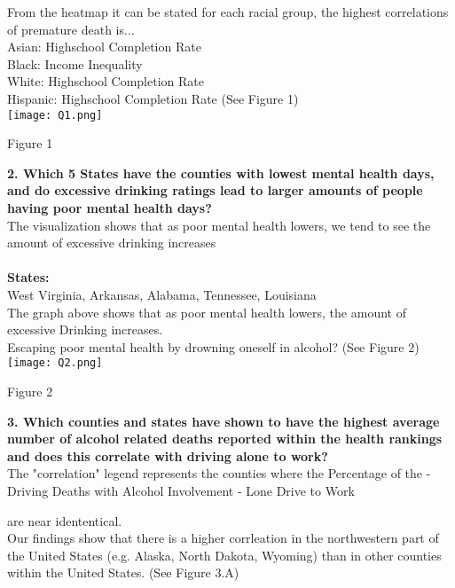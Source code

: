 \documentclass[conference]{IEEEtran}
\begin{document}
From the heatmap it can be stated for each
racial group, the highest correlations of premature death is...\\
Asian: Highschool Completion Rate\\
Black: Income Inequality\\
White: Highschool Completion Rate\\
Hispanic: Highschool Completion Rate (See Figure 1)\\

\texttt{[image: Q1.png]}
\begin{center}
\footnotesize{Figure 1}    
\end{center}

\textbf{2. Which 5 States have the counties with lowest mental
health days, and do
excessive drinking ratings lead to larger amounts of people
having poor mental
health days?}\\

The visualization shows that as poor
mental health lowers, we tend to see
the amount of excessive drinking increases\\
\\
\textbf{States:}\\
West Virginia,
Arkansas,
Alabama,
Tennessee,
Louisiana\\

The graph above shows that as poor mental health lowers, the amount
of excessive Drinking increases.\\
Escaping poor mental health by drowning oneself in alcohol? (See Figure 2)\\


\texttt{[image: Q2.png]}
\begin{center}
\footnotesize{Figure 2}    
\end{center}

\textbf{3. Which counties and states have shown to have the highest
average
number of alcohol related deaths reported within the health
rankings
and does this correlate with driving alone to work?}\\



The "correlation" legend represents the counties where the 
Percentage of the
- Driving Deaths with Alcohol Involvement	
- Lone Drive to Work

are near idententical.\\
Our findings show that there is a higher corrleation in the northwestern
part of the United States (e.g. Alaska, North Dakota, Wyoming)
than in other counties within the United States. (See Figure 3.A)\\
\end{document}
